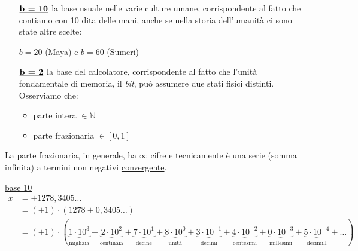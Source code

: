 \begin{itemize}
	\item[$\uline{\textbf{b = 10}}$] la base usuale nelle varie culture umane, corrispondente al fatto che contiamo con 10 dita delle mani, anche se nella storia dell'umanità ci sono state altre scelte:
	\begin{esempio}
	$b = 20$ (Maya) e $b = 60$ (Sumeri)
	\end{esempio}
	\item[$\uline{\textbf{b = 2}}$] la base del calcolatore, corrispondente al fatto che l'unità fondamentale di memoria, il \textit{bit}, può assumere due stati fisici distinti. \\
	Osserviamo che:
	\begin{itemize}
	    \item parte intera $\in \mathbb{N}$
	    \item parte frazionaria $\in [0,1]$
	\end{itemize}
\end{itemize}
La parte frazionaria, in generale, ha $\infty$ cifre e tecnicamente è una serie (somma infinita) a termini non negativi \uline{convergente}.
\begin{esempio}
\uline{base 10}
\[ \begin{split}
    x & = +1278,3405 \dotsc \\
    & = (+1) \cdot (1278 + 0,3405 \dotsc) \\
    & = (+1) \cdot ( \underbrace{1 \cdot 10^3}_{\text {migliaia}} + %
    \underbrace{2 \cdot 10^2}_{\text {centinaia}} + %
    \underbrace{7 \cdot 10^1}_{\text {decine}} + %
    \underbrace{8 \cdot 10^0}_{\text {unità}} + %
    \underbrace{3 \cdot 10^{-1}}_{\text {decimi}} + %
    \underbrace{4 \cdot 10^{-2}}_{\text {centesimi}} + %
    \underbrace{0 \cdot 10^{-3}}_{\text {millesimi}} + %
    \underbrace{5 \cdot 10^{-4}}_{\text {decimill}} + \dotsc) 
\end{split} \]
\end{esempio}

